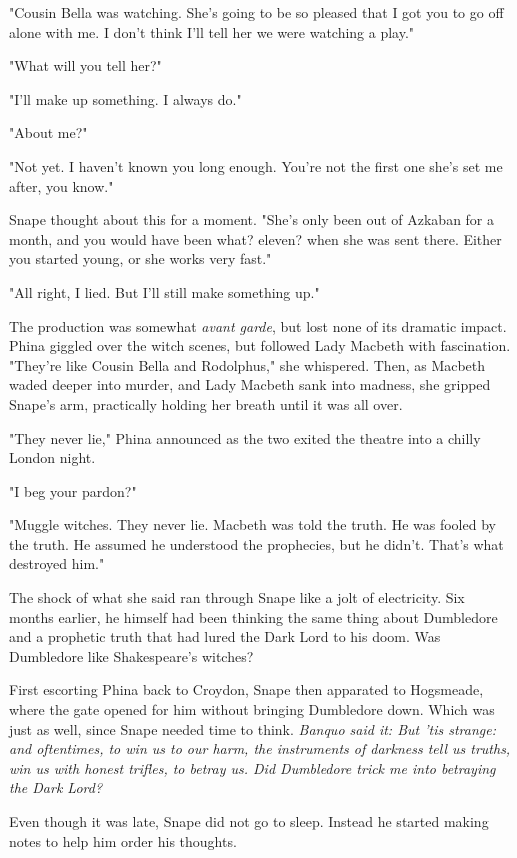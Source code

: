 \documentclass[a4paper,11pt]{article}
\begin{document}
"Cousin Bella was watching. She's going to be so pleased that I got you to go off alone with me. I don't think I'll tell her we were watching a play."

"What will you tell her?"

"I'll make up something. I always do."

"About me?"

"Not yet. I haven't known you long enough. You're not the first one she's set me after, you know."

Snape thought about this for a moment. "She's only been out of Azkaban for a month, and you would have been what? eleven? when she was sent there. Either you started young, or she works very fast."

"All right, I lied. But I'll still make something up."

The production was somewhat \emph{avant garde}, but lost none of its dramatic impact. Phina giggled over the witch scenes, but followed Lady Macbeth with fascination. "They're like Cousin Bella and Rodolphus," she whispered. Then, as Macbeth waded deeper into murder, and Lady Macbeth sank into madness, she gripped Snape's arm, practically holding her breath until it was all over.

"They never lie," Phina announced as the two exited the theatre into a chilly London night.

"I beg your pardon?"

"Muggle witches. They never lie. Macbeth was told the truth. He was fooled by the truth. He assumed he understood the prophecies, but he didn't. That's what destroyed him."

The shock of what she said ran through Snape like a jolt of electricity. Six months earlier, he himself had been thinking the same thing about Dumbledore and a prophetic truth that had lured the Dark Lord to his doom. Was Dumbledore like Shakespeare's witches?

First escorting Phina back to Croydon, Snape then apparated to Hogsmeade, where the gate opened for him without bringing Dumbledore down. Which was just as well, since Snape needed time to think. \emph{Banquo said it: But 'tis strange: and oftentimes, to win us to our harm, the instruments of darkness tell us truths, win us with honest trifles, to betray us. Did Dumbledore trick me into betraying the Dark Lord?}

Even though it was late, Snape did not go to sleep. Instead he started making notes to help him order his thoughts.
\end{document}
